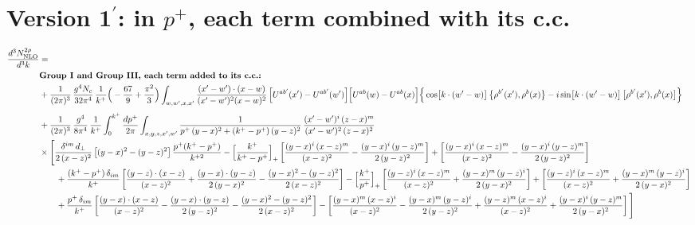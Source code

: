 \documentclass[10pt]{article}
\numberwithin{equation}{section}
\begin{document}
\section{Version 1$^{\prime}$: in $p^{+}$, each term combined with its c.c.}
\begin{align}
\frac{d^{3}N^{2\rho}_{\rm NLO}}{d^{3}k}&=\notag\\
&\textbf{Group I and Group III, each term added to its c.c.:}\notag\\
&+\frac{1}{(2\pi)^{3}}\,\frac{g^{4}N_{c}}{32\pi^{4}}\,\frac{1}{k^{+}}\Big(-\frac{67}{9}+\frac{\pi^{2}}{3}\Big)\int_{w,w^{\prime},x,x^{\prime}}\frac{(x^{\prime}-w^{\prime})\cdot(x-w)}{(x^{\prime}-w^{\prime})^{2}(x-w)^{2}}\,\Big[U^{ab^{\prime}}(x^{\prime})-U^{ab^{\prime}}(w^{\prime})\Big]\Big[U^{ab}(w)-U^{ab}(x)\Big]\Big\{\cos\!\big[k\cdot(w^{\prime}-w)\big]\,\big\{\rho^{b^{\prime}}(x^{\prime}),\rho^{b}(x)\big\}-i\sin\!\big[k\cdot(w^{\prime}-w)\big]\,\big[\rho^{b^{\prime}}(x^{\prime}),\rho^{b}(x)\big]\Big\}\notag\\[4pt]
&+\frac{1}{(2\pi)^{3}}\,\frac{g^{4}}{8\pi^{4}}\,\frac{1}{k^{+}}\int_{0}^{k^{+}}\frac{dp^{+}}{2\pi}\int_{x,y,z,x^{\prime},w^{\prime}}\frac{1}{p^{+}\,(y-x)^{2}+(k^{+}-p^{+})\,(y-z)^{2}}\,\frac{(x^{\prime}-w^{\prime})^{i}\,(z-x)^{m}}{(x^{\prime}-w^{\prime})^{2}\,(z-x)^{2}}\notag\\
&\times\Bigg[\frac{\delta^{im}\,d_{\perp}}{2\,(x-z)^{2}}\left[(y-x)^{2}-(y-z)^{2}\right]\frac{p^{+}(k^{+}-p^{+})}{k^{+2}}
-\Big[\frac{k^{+}}{k^{+}-p^{+}}\Big]_{+}\left[\frac{(y-x)^{i}\,(x-z)^{m}}{(x-z)^{2}}-\frac{(y-x)^{i}\,(y-z)^{m}}{2\,(y-z)^{2}}\right]
+\left[\frac{(y-x)^{i}\,(x-z)^{m}}{(x-z)^{2}}-\frac{(y-x)^{i}\,(y-z)^{m}}{2\,(y-z)^{2}}\right]\notag\\
&\qquad+\frac{(k^{+}-p^{+})\,\delta_{im}}{k^{+}}\left[\frac{(y-z)\cdot(x-z)}{(x-z)^{2}}+\frac{(y-x)\cdot(y-z)}{2\,(y-x)^{2}}-\frac{(y-x)^{2}-(y-z)^{2}}{2\,(x-z)^{2}}\right]
-\Big[\frac{k^{+}}{p^{+}}\Big]_{+}\left[\frac{(y-z)^{i}\,(x-z)^{m}}{(x-z)^{2}}+\frac{(y-x)^{m}\,(y-z)^{i}}{2\,(y-x)^{2}}\right]+\left[\frac{(y-z)^{i}\,(x-z)^{m}}{(x-z)^{2}}+\frac{(y-x)^{m}\,(y-z)^{i}}{2\,(y-x)^{2}}\right]\notag\\
&\qquad+\frac{p^{+}\,\delta_{im}}{k^{+}}\left[\frac{(y-x)\cdot(x-z)}{(x-z)^{2}}-\frac{(y-x)\cdot(y-z)}{2\,(y-z)^{2}}-\frac{(y-x)^{2}-(y-z)^{2}}{2\,(x-z)^{2}}\right]
-\left[\frac{(y-x)^{m}\,(x-z)^{i}}{(x-z)^{2}}-\frac{(y-x)^{m}\,(y-z)^{i}}{2\,(y-z)^{2}}+\frac{(y-z)^{m}\,(x-z)^{i}}{(x-z)^{2}}+\frac{(y-x)^{i}\,(y-z)^{m}}{2\,(y-x)^{2}}\right]\Bigg]\notag\\

\end{align}
\end{document}
